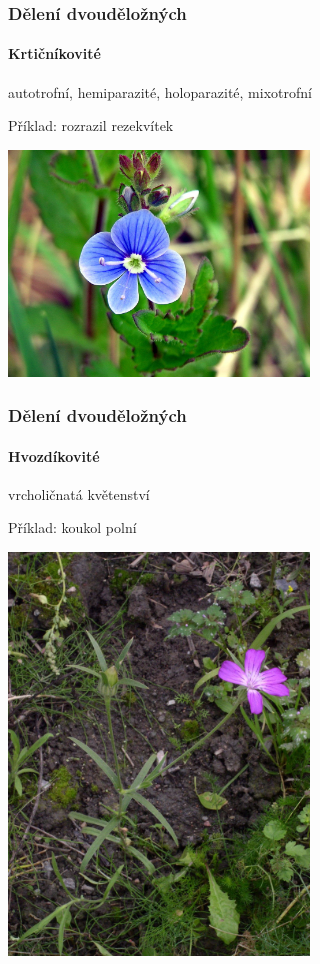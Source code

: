 \documentclass{beamer}
\begin{document}
\begin{frame}
\frametitle{Dělení dvouděložných}
	\framesubtitle{Krtičníkovité}autotrofní, hemiparazité, holoparazité, mixotrofní

Příklad: rozrazil rezekvítek

\begin{center}\includegraphics[width=8cm]{1200px-Veronica_chamaedrys_ziedas.jpg}\end{center}
\end{frame}
\begin{frame}
\frametitle{Dělení dvouděložných}
	\framesubtitle{Hvozdíkovité}vrcholičnatá květenství

Příklad: koukol polní

\begin{center}\includegraphics[width=8cm]{1200px-Agrostemma_githago_habitus_1_AB.jpg}\end{center}
\end{frame}
\end{document}
